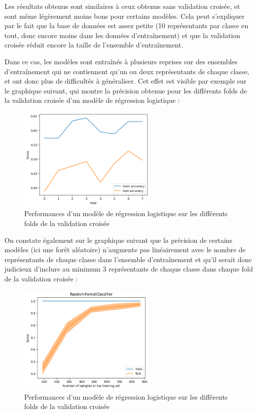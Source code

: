 \documentclass{article}
\begin{document}
Les résultats obtenus sont similaires à ceux obtenus sans validation croisée, et sont
même légèrement moins bons pour certains modèles. Cela peut s'expliquer par le fait
que la base de données est assez petite (10 représentants par classe en tout, donc
encore moins dans les données d'entraînement) et que la validation croisée réduit encore
la taille de l'ensemble d'entraînement. 

Dans ce cas, les modèles sont entraînés à plusieurs reprises
sur des ensembles d'entraînement qui ne contiennent qu'un ou deux représentants de chaque classe,
et ont donc plus de difficultés à généraliser. Cet effet est visible par exemple sur le 
graphique suivant, qui montre la précision obtenue pour les différents folds de la validation
croisée d'un modèle de régression logistique :

\begin{figure}[h]
    \centering
    \includegraphics[width=0.6\textwidth]{img/folds_perfs_logreg.png}
    \caption{Performances d'un modèle de régression logistique sur les différents folds de la validation croisée}
\end{figure}
\newpage

On constate également sur le graphique suivant que la précision de certains modèles
(ici une forêt aléatoire) n'augmente
pas linéairement avec le nombre de représentants de chaque classe dans l'ensemble d'entraînement
et qu'il serait donc judicieux d'inclure au minimum 3 représentants de chaque classe dans chaque
fold de la validation croisée :

\begin{figure}[h]
    \centering
    \includegraphics[width=0.6\textwidth]{img/perf_vs_samples_rf.png}
    \caption{Performances d'un modèle de régression logistique sur les différents folds de la validation croisée}
\end{figure}
\end{document}
